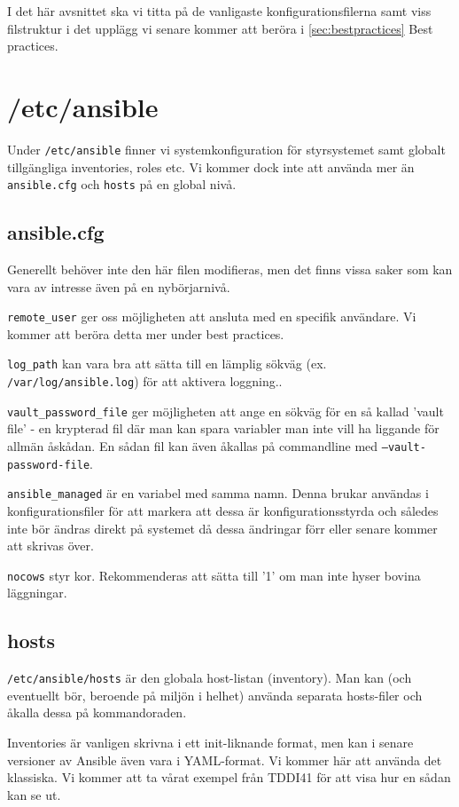 I det här avsnittet ska vi titta på de vanligaste konfigurationsfilerna samt viss filstruktur i det upplägg vi senare kommer att beröra i \ref{sec:bestpractices} Best practices.
\section{/etc/ansible}
Under \texttt{/etc/ansible} finner vi systemkonfiguration för styrsystemet samt globalt tillgängliga inventories, roles etc. Vi kommer dock inte att använda mer än \texttt{ansible.cfg} och \texttt{hosts} på en global nivå.
\subsection{ansible.cfg}
Generellt behöver inte den här filen modifieras, men det finns vissa saker som kan vara av intresse även på
en nybörjarnivå.

\texttt{remote\_user} ger oss möjligheten att ansluta med en specifik användare. Vi kommer att beröra detta mer
under best practices.

\texttt{log\_path} kan vara bra att sätta till en lämplig sökväg (ex. \texttt{/var/log/ansible.log}) för att aktivera loggning..

\texttt{vault\_password\_file} ger möjligheten att ange en sökväg för en så kallad 'vault file' - en krypterad fil 
där man kan spara variabler man inte vill ha liggande för allmän åskådan. En sådan fil kan även åkallas på commandline med \texttt{--vault-password-file}.

\texttt{ansible\_managed} är en variabel med samma namn. Denna brukar användas i konfigurationsfiler för att
markera att dessa är konfigurationsstyrda och således inte bör ändras direkt på systemet då dessa ändringar förr 
eller senare kommer att skrivas över.

\texttt{nocows} styr kor. Rekommenderas att sätta till '1' om man inte hyser bovina läggningar.

\subsection{hosts}
\texttt{/etc/ansible/hosts} är den globala host-listan (inventory). Man kan (och eventuellt bör, beroende på miljön i helhet) använda separata hosts-filer och åkalla dessa på kommandoraden.

Inventories är vanligen skrivna i ett init-liknande format, men kan i senare versioner av Ansible även
vara i YAML-format. Vi kommer här att använda det klassiska. Vi kommer att ta vårat exempel från TDDI41 för att
visa hur en sådan kan se ut.

